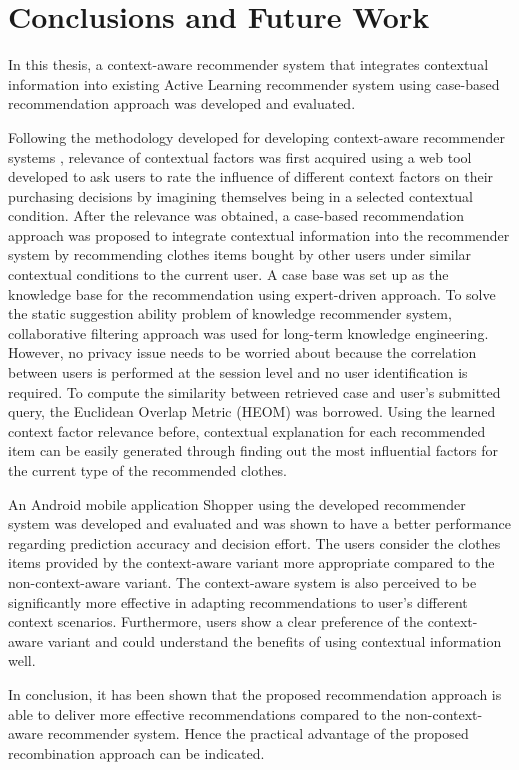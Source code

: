 \chapter{Conclusions and Future Work}\label{chapter:conclusions}

In this thesis, a context-aware recommender system that integrates contextual information into existing Active Learning recommender system using case-based recommendation approach was developed and evaluated.

Following the methodology developed for developing context-aware recommender systems \cite{ref:5}, relevance of contextual factors was first acquired using a web tool developed to ask users to rate the influence of different context factors on their purchasing decisions by imagining themselves being in a selected contextual condition. After the relevance was obtained, a case-based recommendation approach was proposed to integrate contextual information into the recommender system by recommending clothes items bought by other users under similar contextual conditions to the current user. A case base was set up as the knowledge base for the recommendation using expert-driven approach. To solve the static suggestion ability problem of knowledge recommender system, collaborative filtering approach was used for long-term knowledge engineering. However, no privacy issue needs to be worried about because the correlation between users is performed at the session level and no user identification is required. To compute the similarity between retrieved case and user's submitted query, the Euclidean Overlap Metric (HEOM) was borrowed. Using the learned context factor relevance before, contextual explanation for each recommended item can be easily generated through finding out the most influential factors for the current type of the recommended clothes.

An Android mobile application Shopper using the developed recommender system was developed and evaluated and was shown to have a better performance regarding prediction accuracy and decision effort. The users consider the clothes items provided by the context-aware variant more appropriate compared to the non-context-aware variant. The context-aware system is also perceived to be significantly more effective in adapting recommendations to user's different context scenarios. Furthermore, users show a clear preference of the context-aware variant and could understand the benefits of using contextual information well. 

In conclusion, it has been shown that the proposed recommendation approach is able to deliver more effective recommendations compared to the non-context-aware recommender system. Hence the practical advantage of the proposed recombination approach can be indicated.

